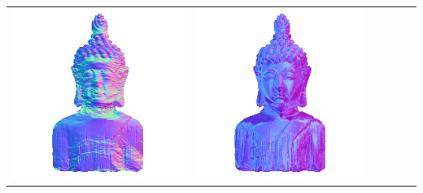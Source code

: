 \begin{tabularx}{\linewidth}{@{}Y@{}Y@{}Y@{}Y@{}Y@{}Y@{}}
\includegraphics[width=\linewidth]{semisynthetic/20150514_16_yu_out.png} &
\includegraphics[width=\linewidth]{semisynthetic/20150514_16_dpsn_out.png} &

\end{tabularx}
